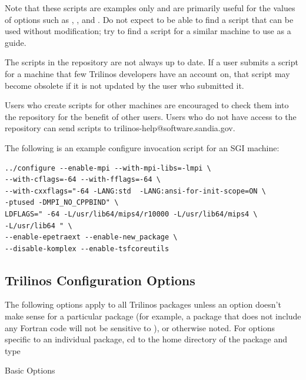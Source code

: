 \begin{enumerate}
Note that these scripts 
are examples only and are primarily useful for the values of options such as 
, , 
and .  Do not expect to be able to find a 
script that can be used without modification; try to find a script for a 
similar machine to use as a guide.  

The scripts in the 
repository are not always up to date.  If a user submits a script for a 
machine that few Trilinos developers have an account on, that script may 
become obsolete if it is not updated by the user who submitted it.

Users who create scripts for other machines are encouraged to check them into 
the repository for the benefit of other users.  Users who do not have access to
the repository can send scripts to trilinos-help@software.sandia.gov.

The following is an example configure invocation script for an SGI machine:

\begin{verbatim}
../configure --enable-mpi --with-mpi-libs=-lmpi \
--with-cflags=-64 --with-fflags=-64 \
--with-cxxflags="-64 -LANG:std  -LANG:ansi-for-init-scope=ON \
-ptused -DMPI_NO_CPPBIND" \
LDFLAGS=" -64 -L/usr/lib64/mips4/r10000 -L/usr/lib64/mips4 \
-L/usr/lib64 " \
--enable-epetraext --enable-new_package \
--disable-komplex --enable-tsfcoreutils
\end{verbatim}
\end{enumerate}

\subsection{Trilinos Configuration Options}
\label{subsect:TrilinosConfigOptions}
The following options apply to all Trilinos packages unless 
an option doesn't make sense for a particular package (for example, a 
package that does not include any Fortran code will not be sensitive to 
), or otherwise noted.  For options specific to 
an individual package, cd to the home directory of the 
package and type 

Basic Options

